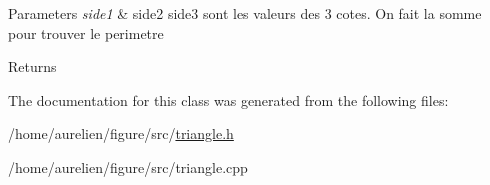 \begin{DoxyParams}{Parameters}
{\em side1} & side2 side3 sont les valeurs des 3 cotes. On fait la somme pour trouver le perimetre \\
\hline
\end{DoxyParams}
\begin{DoxyReturn}{Returns}

\end{DoxyReturn}


The documentation for this class was generated from the following files\+:\begin{DoxyCompactItemize}
\item 
/home/aurelien/figure/src/\hyperlink{triangle_8h}{triangle.\+h}\item 
/home/aurelien/figure/src/triangle.\+cpp\end{DoxyCompactItemize}
